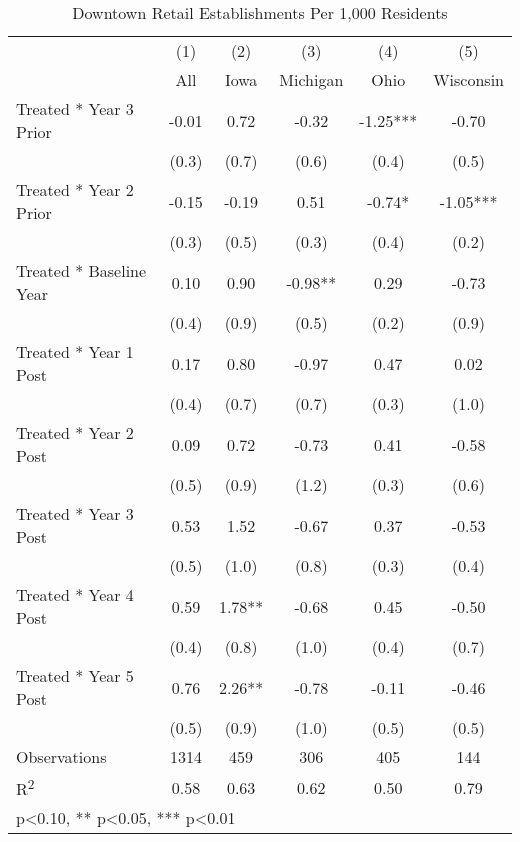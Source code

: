 \begin{table}[htbp]\centering
\def\sym#1{\ifmmode^{#1}\else\(^{#1}\)\fi}
\caption{Downtown Retail Establishments Per 1,000 Residents}
\begin{tabular}{l*{5}{c}}
\toprule
            &\multicolumn{1}{c}{(1)}   &\multicolumn{1}{c}{(2)}   &\multicolumn{1}{c}{(3)}   &\multicolumn{1}{c}{(4)}   &\multicolumn{1}{c}{(5)}   \\
            &         All   &        Iowa   &    Michigan   &        Ohio   &   Wisconsin   \\
\midrule
Treated * Year 3 Prior&       -0.01   &        0.72   &       -0.32   &       -1.25***&       -0.70   \\
            &       (0.3)   &       (0.7)   &       (0.6)   &       (0.4)   &       (0.5)   \\
Treated * Year 2 Prior&       -0.15   &       -0.19   &        0.51   &       -0.74*  &       -1.05***\\
            &       (0.3)   &       (0.5)   &       (0.3)   &       (0.4)   &       (0.2)   \\
Treated * Baseline Year&        0.10   &        0.90   &       -0.98** &        0.29   &       -0.73   \\
            &       (0.4)   &       (0.9)   &       (0.5)   &       (0.2)   &       (0.9)   \\
Treated * Year 1 Post&        0.17   &        0.80   &       -0.97   &        0.47   &        0.02   \\
            &       (0.4)   &       (0.7)   &       (0.7)   &       (0.3)   &       (1.0)   \\
Treated * Year 2 Post&        0.09   &        0.72   &       -0.73   &        0.41   &       -0.58   \\
            &       (0.5)   &       (0.9)   &       (1.2)   &       (0.3)   &       (0.6)   \\
Treated * Year 3 Post&        0.53   &        1.52   &       -0.67   &        0.37   &       -0.53   \\
            &       (0.5)   &       (1.0)   &       (0.8)   &       (0.3)   &       (0.4)   \\
Treated * Year 4 Post&        0.59   &        1.78** &       -0.68   &        0.45   &       -0.50   \\
            &       (0.4)   &       (0.8)   &       (1.0)   &       (0.4)   &       (0.7)   \\
Treated * Year 5 Post&        0.76   &        2.26** &       -0.78   &       -0.11   &       -0.46   \\
            &       (0.5)   &       (0.9)   &       (1.0)   &       (0.5)   &       (0.5)   \\
\midrule
Observations &        1314   &         459   &         306   &         405   &         144   \\
R\textsuperscript{2} &        0.58   &        0.63   &        0.62   &        0.50   &        0.79   \\
\bottomrule
\multicolumn{6}{l}{\footnotesize * p<0.10, ** p<0.05, *** p<0.01}\\
\end{tabular}
\end{table}
